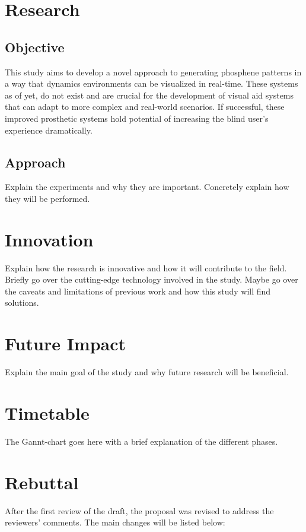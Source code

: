 \documentclass[10pt]{article}
\begin{document}
\pagestyle{rest} %

\section*{Research}\label{sec:research}
\subsection*{Objective}\label{subsec:objective}
This study aims to develop a novel approach to generating phosphene patterns
in a way that dynamics environments can be visualized in real-time. These
systems as of yet, do not exist and are crucial for the development of visual
aid systems that can adapt to more complex and real-world scenarios. If
successful, these improved prosthetic systems hold potential of increasing
the blind user's experience dramatically.

\subsection*{Approach}\label{subsec:approach}
Explain the experiments and why they are important. Concretely explain how they
will be performed.


\section*{Innovation}\label{sec:innovation}
Explain how the research is innovative and how it will contribute to the field.
Briefly go over the cutting-edge technology involved in the study. Maybe go
over the caveats and limitations of previous work and how this study will find
solutions.

\section*{Future Impact}\label{sec:impact}
Explain the main goal of the study and why future research will be beneficial.

\section*{Timetable}\label{sec:timetable}
The Gannt-chart goes here with a brief explanation of the different phases.

\printbibliography%

\section*{Rebuttal}\label{sec:rebuttal}
After the first review of the draft, the proposal was revised to address the
reviewers' comments. The main changes will be listed below:
\end{document}
